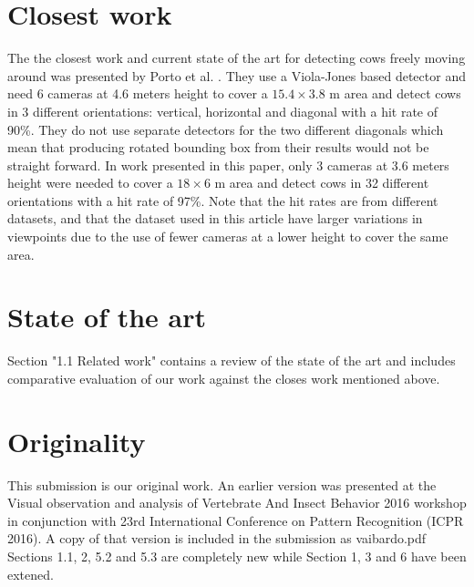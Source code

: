 \documentclass[10pt,a4paper]{article}
\begin{document}
\section{Closest work}
The the closest work and current state of the art for detecting cows freely moving around was presented by Porto et al. \cite{porto2015automatic}. They use a Viola-Jones based detector and need 
6 cameras at 4.6 meters height to cover a $15.4 \times 3.8$ m area and detect cows in 3 different orientations: vertical, horizontal and diagonal with a hit rate of 90\%. They do not use separate detectors for the two different diagonals which mean that producing rotated bounding box from their results would not be straight forward. In work presented in this paper, only 3 cameras at 3.6 meters height were needed to cover a $18 \times 6$ m area and detect cows in 32 different orientations with a hit rate of 97\%. Note that the hit rates are from different datasets, and that the dataset used in this article have larger variations in viewpoints due to the use of fewer cameras at a lower height to cover the same area.

\section{State of the art}
Section "1.1 Related work" contains a review of the state of the art and includes comparative evaluation of our work against the closes work mentioned above.

\section{Originality}
This submission is our original work. An earlier version was presented at the Visual observation and analysis of Vertebrate And Insect Behavior 2016 workshop  in conjunction with 23rd International Conference on Pattern Recognition (ICPR 2016). A copy of that version is included in the submission as vaibardo.pdf Sections 1.1, 2, 5.2 and 5.3 are completely new while Section 1, 3 and 6 have been extened.


{\parindent0pt
\parskip8pt

}
\end{document}
